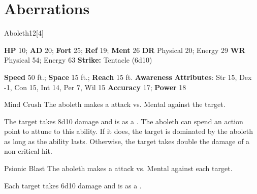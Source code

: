 
        \section{Aberrations}
      
  \begin{monsection}{Aboleth}{12}[4]
    \vspace{-1em}\vspace{-1em}
    \begin{spellcontent}
      \begin{spelltargetinginfo}
        \pari \textbf{HP} 10;
          \textbf{AD} 20;
          \textbf{Fort} 25;
          \textbf{Ref} 19;
          \textbf{Ment} 26
        \pari \textbf{DR} Physical 20; Energy 29
        \pari \textbf{WR} Physical 54; Energy 63
        \pari \textbf{Strike:}
            Tentacle  (6d10)
      \end{spelltargetinginfo}
    \end{spellcontent}
    \begin{monsterfooter}
      \pari \textbf{Speed} 50 ft.;
        \textbf{Space} 15 ft.;
        \textbf{Reach} 15 ft.
      \pari \textbf{Awareness} 
      \pari \textbf{Attributes}:
        Str 15, Dex -1, Con 15,
        Int 14, Per 7, Wil 15
      \pari \textbf{Accuracy} 17;
        \textbf{Power} 18
    \end{monsterfooter}
  \end{monsection}
  \begin{freeability}{Mind Crush}
      The aboleth makes a  attack
        vs. Mental against the target.
    
    \hit The target takes 8d10  damage and is  as a .
    \crit 
          The aboleth can spend an action point to attune to this ability.
          If it does, the target is dominated by the aboleth as long as the ability lasts.
          Otherwise, the target takes double the damage of a non-critical hit.
    \end{freeability}
  

    \begin{freeability}{Psionic Blast}
      The aboleth makes a  attack
        vs. Mental against each target.
    
    \hit Each target takes 6d10  damage and is  as a .
    \end{freeability}
  

